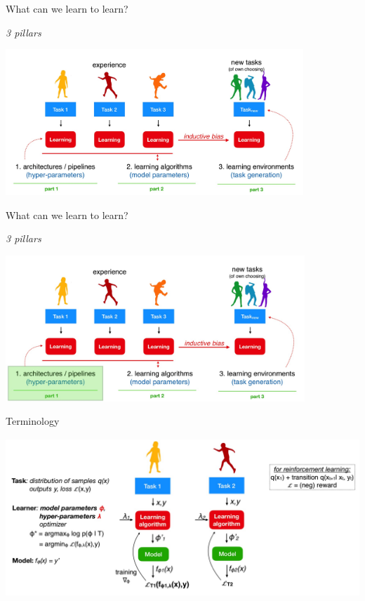 \documentclass[aspectratio=169,t,handout,xcolor={usenames,dvipsnames}]{beamer}
\begin{document}
\begin{frame}{What can we learn to learn?}
\centerline{\textit{3 pillars}}
\centering\includegraphics[height=5.5cm]{image/Jietu20220328-194451.jpg}

\end{frame}
\begin{frame}{What can we learn to learn?}
\centerline{\textit{3 pillars}}
\centering\includegraphics[height=5.5cm]{image/Jietu20220328-194520.jpg}

\end{frame}
\begin{frame}{Terminology}

\centering\includegraphics[height=6cm]{image/Jietu20220328-194743.jpg}

\end{frame}
\end{document}
